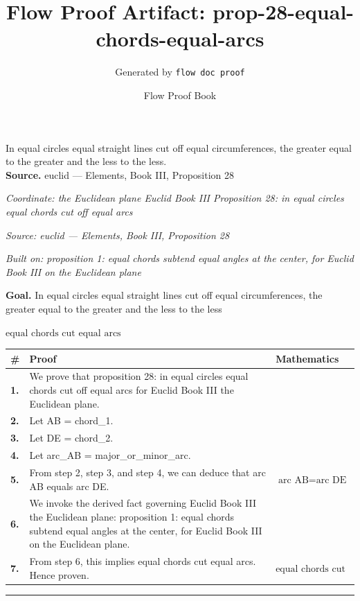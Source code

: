 \documentclass[11pt]{article}
\title{Flow Proof Artifact: prop-28-equal-chords-equal-arcs}
\author{Generated by \texttt{flow doc proof}}
\date{Flow Proof Book}
\theoremstyle{definition}
\begin{document}
\maketitle
In equal circles equal straight lines cut off equal circumferences, the greater equal to the greater and the less to the less.\\[0.5em]
\textbf{Source.} euclid — Elements, Book III, Proposition 28\\[0.5em]
\bigskip
{}\par
\smallskip\noindent\textit{Coordinate: the Euclidean plane \cdot Euclid Book III \cdot Proposition 28: in equal circles equal chords cut off equal arcs}\par
\smallskip\noindent\textit{Source: euclid — Elements, Book III, Proposition 28}\par
\smallskip\noindent\textit{Built on: proposition 1: equal chords subtend equal angles at the center, for Euclid Book III on the Euclidean plane}\par
\medskip
\noindent\textbf{Goal.} In equal circles equal straight lines cut off equal circumferences, the greater equal to the greater and the less to the less\par
\noindent$\displaystyle \text{equal chords cut equal arcs}$\par
\medskip
\noindent
\begin{tabular}{@{} >{\raggedright\arraybackslash}p{} >{\raggedright\arraybackslash}p{} >{\raggedleft\arraybackslash}p{} @{}}
\textbf{\#} & \textbf{Proof} & \textbf{Mathematics} \\
\midrule
\textbf{1.} & We prove that proposition 28: in equal circles equal chords cut off equal arcs for Euclid Book III the Euclidean plane. & \\[0.45em]
\textbf{2.} & Let AB = chord\_1. & \\[0.45em]
\textbf{3.} & Let DE = chord\_2. & \\[0.45em]
\textbf{4.} & Let arc\_AB = major\_or\_minor\_arc. & \\[0.45em]
\textbf{5.} & From step 2, step 3, and step 4, we can deduce that arc AB equals arc DE. & $\displaystyle \text{arc AB} = \text{arc DE}$ \\[0.45em]
\textbf{6.} & We invoke the derived fact governing Euclid Book III the Euclidean plane: proposition 1: equal chords subtend equal angles at the center, for Euclid Book III on the Euclidean plane. & \\[0.45em]
\textbf{7.} & From step 6, this implies equal chords cut equal arcs. Hence proven. & $\displaystyle \text{equal chords cut equal arcs}$ \\[0.45em]
\bottomrule
\end{tabular}
\label{thm:Geometry-Euclid Book III-proposition_28_in_equal_circles_equal_chords_cut_off_equal_arcs}
\par\medskip\hrule
\end{document}
